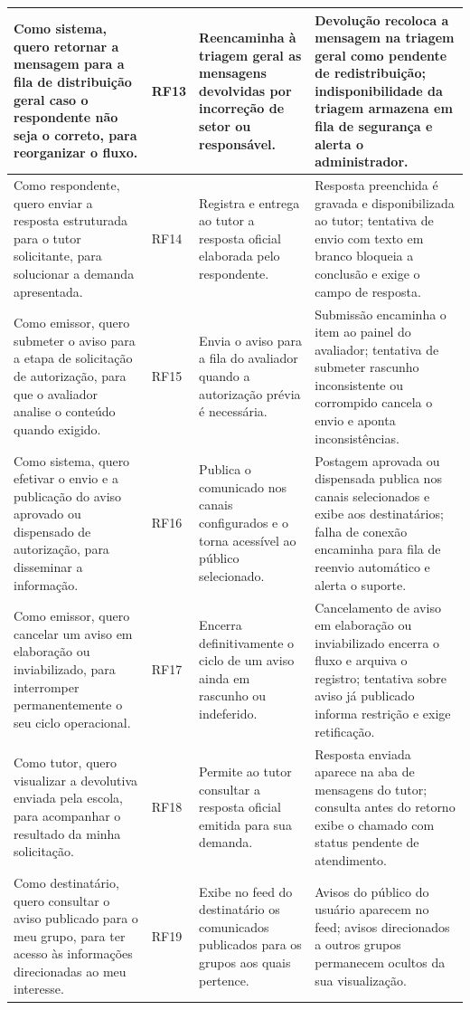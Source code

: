 \documentclass[a4paper,12pt]{report}
\begin{document}
\begin{longtable}{|p{3.8cm}|p{1.8cm}|p{4.2cm}|p{4.8cm}|}
\hline
Como sistema, quero retornar a mensagem para a fila de distribuição geral caso o respondente não seja o correto, para reorganizar o fluxo. & RF13 & Reencaminha à triagem geral as mensagens devolvidas por incorreção de setor ou responsável. & Devolução recoloca a mensagem na triagem geral como pendente de redistribuição; indisponibilidade da triagem armazena em fila de segurança e alerta o administrador. \\
\hline
Como respondente, quero enviar a resposta estruturada para o tutor solicitante, para solucionar a demanda apresentada. & RF14 & Registra e entrega ao tutor a resposta oficial elaborada pelo respondente. & Resposta preenchida é gravada e disponibilizada ao tutor; tentativa de envio com texto em branco bloqueia a conclusão e exige o campo de resposta. \\
\hline
Como emissor, quero submeter o aviso para a etapa de solicitação de autorização, para que o avaliador analise o conteúdo quando exigido. & RF15 & Envia o aviso para a fila do avaliador quando a autorização prévia é necessária. & Submissão encaminha o item ao painel do avaliador; tentativa de submeter rascunho inconsistente ou corrompido cancela o envio e aponta inconsistências. \\
\hline
Como sistema, quero efetivar o envio e a publicação do aviso aprovado ou dispensado de autorização, para disseminar a informação. & RF16 & Publica o comunicado nos canais configurados e o torna acessível ao público selecionado. & Postagem aprovada ou dispensada publica nos canais selecionados e exibe aos destinatários; falha de conexão encaminha para fila de reenvio automático e alerta o suporte. \\
\hline
Como emissor, quero cancelar um aviso em elaboração ou inviabilizado, para interromper permanentemente o seu ciclo operacional. & RF17 & Encerra definitivamente o ciclo de um aviso ainda em rascunho ou indeferido. & Cancelamento de aviso em elaboração ou inviabilizado encerra o fluxo e arquiva o registro; tentativa sobre aviso já publicado informa restrição e exige retificação. \\
\hline
Como tutor, quero visualizar a devolutiva enviada pela escola, para acompanhar o resultado da minha solicitação. & RF18 & Permite ao tutor consultar a resposta oficial emitida para sua demanda. & Resposta enviada aparece na aba de mensagens do tutor; consulta antes do retorno exibe o chamado com status pendente de atendimento. \\
\hline
Como destinatário, quero consultar o aviso publicado para o meu grupo, para ter acesso às informações direcionadas ao meu interesse. & RF19 & Exibe no feed do destinatário os comunicados publicados para os grupos aos quais pertence. & Avisos do público do usuário aparecem no feed; avisos direcionados a outros grupos permanecem ocultos da sua visualização. \\

\end{longtable}
\end{document}
